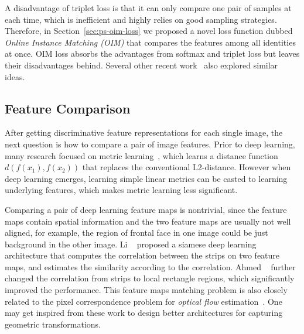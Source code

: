 A disadvantage of triplet loss is that it can only compare one pair of samples at each time, which is inefficient and highly relies on good sampling strategies. Therefore, in Section~\ref{sec:ps-oim-loss} we proposed a novel loss function dubbed \emph{Online Instance Matching (OIM)} that compares the features among all identities at once. OIM loss absorbs the advantages from softmax and triplet loss but leaves their disadvantages behind. Several other recent work~\cite{wen2016discriminative,titsias2016one,snell2017prototypical} also explored similar ideas.

\subsection{Feature Comparison} %
\label{sub:human-id-feat-comp}
After getting discriminative feature representations for each single image, the next question is how to compare a pair of image features. Prior to deep learning, many research focused on metric learning~\cite{davis2007information,weinberger2005distance,mcfee2010metric,koestinger2012large,liao2015person,zhang2016learning}, which learns a distance function $d(f(x_1), f(x_2))$ that replaces the conventional L2-distance. However when deep learning emerges, learning simple linear metrics can be casted to learning underlying features, which makes metric learning less significant.

Comparing a pair of deep learning feature maps is nontrivial, since the feature maps contain spatial information and the two feature maps are usually not well aligned, for example, the region of frontal face in one image could be just background in the other image. Li \etal~\cite{li2014deepreid} proposed a siamese deep learning architecture that computes the correlation between the strips on two feature maps, and estimates the similarity according to the correlation. Ahmed \etal~\cite{ahmed2015improved} further changed the correlation from strips to local rectangle regions, which significantly improved the performance. This feature maps matching problem is also closely related to the pixel correspondence problem for \emph{optical flow} estimation~\cite{weinzaepfel2013deepflow,revaud2016deepmatching}. One may get inspired from these work to design better architectures for capturing geometric transformations.

